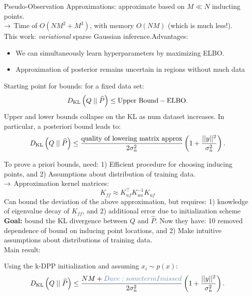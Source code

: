 Pseudo-Observation Approximations: approximate based on $M \ll N$ inducting points. \\
$\rightarrow$ Time of $O(NM^2 + M^3)$, with memory $O(NM)$ (which is much less!). \\

This work: {\it variational} sparse Gaussian inference.Advantages: 
\begin{itemize}
    \item We can simultaneously learn hyperparameters by maximizing ELBO.
    \item Approximation of posterior remains uncertain in regions without much data
\end{itemize}


Starting point for bounds: for a fixed data set:
\[
D_{\text{KL}}\left(Q \mid \mid \widehat{P}\right) \leq \text{Upper Bound} - \text{ELBO}.
\]
Upper and lower bounds collapse on the KL as num dataset increases. In particular, a posteriori bound leads to:
\[
D_{\text{KL}}\left(Q \mid \mid \widehat{P}\right) \leq \frac{\text{quality of lowering matrix approx}}{2\sigma_n^2} \left(1 + \frac{||y||^2}{\sigma_n^2}\right).
\]


To prove a priori bounds, need: 1) Efficient procedure for choosing inducing points, and 2) Assumptions about distribution of training data. \\

$\rightarrow$ Approximation kernel matrices:
\[
K_{ff} \approx K_{uf}^\top K_{uu}^{-1} K_{uf}
\]
Can bound the deviation of the above approximation, but requires: 1) knowledge of eigenvalue decay of $K_{ff}$, and 2) additional error due to initialization scheme \\

{\bf Goal:} bound the KL divergence between $Q$ and $\widehat{P}$. Now they have: 10 removed dependence of bound on inducing point locations, and 2) Make intuitive assumptions about distributions of training data. \\

Main result:
\begin{theorem}
Using the k-DPP initialization and assuming $x_i \sim p(x)$:
\[
\KL{Q}{\widehat{P}} \leq \frac{NM + \dnote{some term I missed}}{2\sigma_n^2} \left(1 + \frac{||y||^2}{\sigma_n^2}\right).
\]
\end{theorem}


